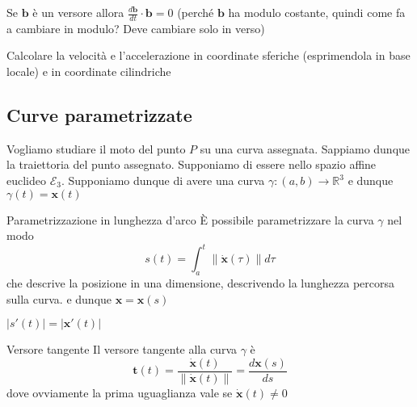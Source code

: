 \begin{remark}
    Se \(\mathbf{b} \) è un versore allora \(\frac{d\mathbf{b} }{dt} \cdot
    \mathbf{b} = 0\) (perché \(\mathbf{b} \) ha modulo costante, quindi come fa
    a cambiare in modulo? Deve cambiare solo in verso)
\end{remark}
\begin{eser}
    Calcolare la velocità e l'accelerazione in coordinate sferiche (esprimendola
    in base locale) e in coordinate cilindriche
\end{eser}

\subsection{Curve parametrizzate}
Vogliamo studiare il moto del punto \(P\) su una curva assegnata. Sappiamo
dunque la traiettoria del punto assegnato. Supponiamo di essere nello spazio
affine euclideo \(\mathcal{E}_3\). Supponiamo dunque di avere una curva
\(\gamma: {(a, b)} \to \mathbb{R}^3\) e dunque \(\gamma{(t)} = \mathbf{x} {(t)}\) 
\begin{definition}{Parametrizzazione in lunghezza d'arco}
    È possibile parametrizzare la curva \(\gamma\) nel modo
    \[
        s{(t)} = \int_{a}^{t} \|\mathbf{\dot{x}}{(\tau)}\| d\tau
    \]
    che descrive la posizione in una dimensione, descrivendo la lunghezza
    percorsa sulla curva.
    e dunque \(\mathbf{x} = \mathbf{x} {(s)}\) 
\end{definition}
\begin{remark}
    \(|s'{(t)}| = |\mathbf{x}'{(t)}|\) 
\end{remark}
\begin{definition}{Versore tangente}
    Il versore tangente alla curva \(\gamma\) è
    \[
        \mathbf{t} {(t)} =
        \frac{\mathbf{\dot{x}}{(t)}}{\|\mathbf{\dot{x}}{(t)}\|} =
        \frac{d\mathbf{x} {(s)}}{ds}
    \]
    dove ovviamente la prima uguaglianza vale se \(\mathbf{\dot{x}}{(t)} \neq
    0\)
\end{definition}

